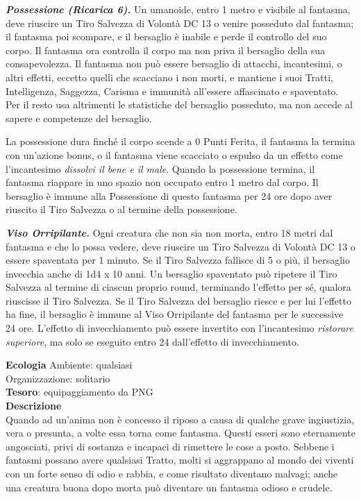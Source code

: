 \begin{multicols}{2}
	\textit{\textbf{Possessione (Ricarica 6).}} Un umanoide, entro 1 metro e visibile al fantasma, deve riuscire un Tiro Salvezza di Volontà DC 13 o venire posseduto dal fantasma; il fantasma poi scompare, e il bersaglio è inabile e perde il controllo del suo corpo. Il fantasma ora controlla il corpo ma non priva il bersaglio della sua consapevolezza. Il fantasma non può essere bersaglio di attacchi, incantesimi, o altri effetti, eccetto quelli che scacciano i non morti, e mantiene i suoi Tratti, Intelligenza, Saggezza, Carisma e immunità all'essere affascinato e spaventato. Per il resto usa altrimenti le statistiche del bersaglio posseduto, ma non accede al sapere e competenze del bersaglio.

	La possessione dura finché il corpo scende a 0 Punti Ferita, il fantasma la termina con un'azione bonus, o il fantasma viene scacciato o espulso da un effetto come l'incantesimo \textit{dissolvi il bene e il male}. Quando la possessione termina, il fantasma riappare in uno spazio non occupato entro 1 metro dal corpo. Il bersaglio è immune alla Possessione di questo fantasma per 24 ore dopo aver riuscito il Tiro Salvezza o al termine della possessione.

	\textit{\textbf{Viso Orripilante.}} Ogni creatura che non sia non morta, entro 18 metri dal fantasma e che lo possa vedere, deve riuscire un Tiro Salvezza di Volontà DC 13 o essere spaventata per 1 minuto. Se il Tiro Salvezza fallisce di 5 o più, il bersaglio invecchia anche di 1d4 x 10 anni. Un bersaglio spaventato può ripetere il Tiro Salvezza al termine di ciascun proprio round, terminando l'effetto per sé, qualora riuscisse il Tiro Salvezza. Se il Tiro Salvezza del bersaglio riesce e per lui l'effetto ha fine, il bersaglio è immune al Viso Orripilante del fantasma per le successive 24 ore. L'effetto di invecchiamento può essere invertito con l'incantesimo \textit{ristorare superiore}, ma solo se eseguito entro 24 dall'effetto di invecchiamento.

	\textbf{Ecologia}
	Ambiente: qualsiasi\\
	Organizzazione: solitario\\
	\textbf{Tesoro}: equipaggiamento da PNG\\
	\textbf{Descrizione}\\
	Quando ad un'anima non è concesso il riposo a causa di qualche grave ingiustizia, vera o presunta, a volte essa torna come fantasma. Questi esseri sono eternamente angosciati, privi di sostanza e incapaci di rimettere le cose a posto. Sebbene i fantasmi possano avere qualsiasi Tratto, molti si aggrappano al mondo dei viventi con un forte senso di odio e rabbia, e come risultato diventano malvagi; anche una creatura buona dopo morta può diventare un fantasma odioso e crudele.\\


\end{multicols}
